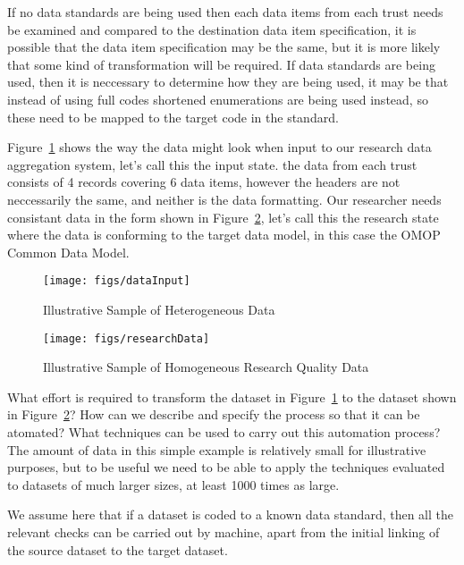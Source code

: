 \documentclass[runningheads]{llncs}
\begin{document}
If no data standards are being used then each data items from each trust needs be examined and compared to the destination data item specification, it is possible that the data item specification may be the same, but it is more likely that some kind of transformation will be required. If data standards are being used, then it is neccessary to determine how they are being used, it may be that instead of using full codes shortened enumerations are being used instead, so these need to be mapped to the target code in the standard.

Figure~\ref{fig:dataInput} shows the way the data might look when input to our research data aggregation system, let's call this the input state. the data from each trust consists of 4 records covering 6 data items, however the headers are not neccessarily the same, and neither is the data formatting. Our researcher needs consistant data in the form shown in Figure~\ref{fig:researchData}, let's call this the research state where the data is conforming to the target data model, in this case the OMOP Common Data Model. 
\begin{figure}[h]
	\texttt{[image: figs/dataInput]}
	\caption{Illustrative Sample of Heterogeneous Data}
	\label{fig:dataInput}
\end{figure}

\begin{figure}[h]
	\texttt{[image: figs/researchData]}
	\caption{Illustrative Sample of Homogeneous Research Quality Data}
	\label{fig:researchData}
\end{figure}

What effort is required to transform the dataset in Figure~\ref{fig:dataInput} to the dataset shown in Figure~\ref{fig:researchData}? How can we describe and specify the process so that it can be atomated? What techniques can be used to carry out this automation process? The amount of data in this simple example is relatively small for illustrative purposes, but to be useful we need to be able to apply the techniques evaluated to datasets of much larger sizes, at least 1000 times as large. 

We assume here that if a dataset is coded to a known data standard, then all the relevant checks can be carried out by machine, apart from the initial linking of the source dataset to the target dataset.
\end{document}
